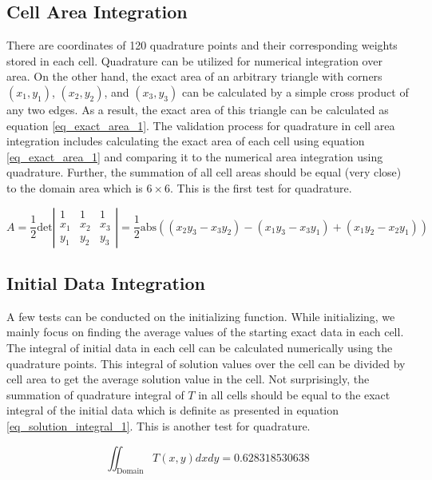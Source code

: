 \documentclass{article}
\begin{document}
\subsection{Cell Area Integration}
There are coordinates of 120 quadrature points and their corresponding weights stored in each cell. Quadrature can be utilized for numerical integration over area. On the other hand, the exact area of an arbitrary triangle with corners $(x_1,y_1)$, $(x_2,y_2)$, and $(x_3,y_3)$ can be calculated by a simple cross product of any two edges. As a result, the exact area of this triangle can be calculated as equation \ref{eq_exact_area_1}. The validation process for quadrature in cell area integration includes calculating the exact area of each cell using equation \ref{eq_exact_area_1} and comparing it to the numerical area integration using quadrature. Further, the summation of all cell areas should be equal (very close) to the domain area which is $6\times 6$. This is the first test for quadrature.

\begin{equation}
\label{eq_exact_area_1}
A=\dfrac{1}{2} \text{det}\left|
\begin{matrix}
1 & 1 & 1 \\
x_1 & x_2 & x_3 \\
y_1 & y_2 & y_3
\end{matrix}
\right|=\dfrac{1}{2}\text{abs}((x_2y_3-x_3y_2)-(x_1y_3-x_3y_1)+(x_1y_2-x_2y_1))
\end{equation}

\subsection{Initial Data Integration}
A few tests can be conducted on the initializing function. While initializing, we mainly focus on finding the average values of the starting exact data in each cell. The integral of initial data in each cell can be calculated numerically using the quadrature points. This integral of solution values over the cell can be divided by cell area to get the average solution value in the cell. Not surprisingly, the summation of quadrature integral of $T$ in all cells should be equal to the exact integral of the initial data which is definite as presented in equation \ref{eq_solution_integral_1}. This is another test for quadrature.

\begin{equation}
\label{eq_solution_integral_1}
\iint_{\text{Domain}} T(x,y) dx dy =0.628318530638
\end{equation}
\end{document}
